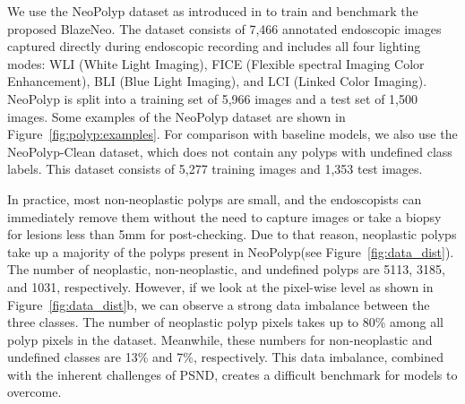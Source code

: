 \documentclass{ieeeaccess}
\newcommand{\ModelName}{BlazeNeo\xspace}
\newcommand{\DatasetName}{NeoPolyp\xspace}
\newcommand{\CleanDatasetName}{NeoPolyp-Clean\xspace}
\begin{document}
\begin{center}
    \begin{figure*}[ht!]
        \caption{Data distribution of polyp class labels in the \DatasetName dataset. In the pixel-wise distribution on the right, percentages are calculated on polyp pixels only (not including background pixels.)}
        \label{fig:data_dist}
    \end{figure*}
\end{center}

We use the \DatasetName dataset as introduced in \cite{lan2021neounet} to train and benchmark the proposed \ModelName{}. The dataset consists of 7,466 annotated endoscopic images captured directly during endoscopic recording and includes all four lighting modes: WLI (White Light Imaging), FICE (Flexible spectral Imaging Color Enhancement), BLI (Blue Light Imaging), and LCI (Linked Color Imaging). \DatasetName is split into a training set of 5,966 images and a test set of 1,500 images. Some examples of the \DatasetName dataset are shown in Figure~\ref{fig:polyp:examples}. For comparison with baseline models, we also use the \CleanDatasetName dataset, which does not contain any polyps with undefined class labels. This dataset consists of 5,277 training images and 1,353 test images.

In practice, most non-neoplastic polyps are small, and the endoscopists can immediately remove them without the need to capture images or take a biopsy for lesions less than 5mm for post-checking. Due to that reason, neoplastic polyps take up a majority of the polyps present in \DatasetName (see Figure~\ref{fig:data_dist}). The number of neoplastic, non-neoplastic, and undefined polyps are 5113, 3185, and 1031, respectively. However, if we look at the pixel-wise level as shown in Figure~\ref{fig:data_dist}b, we can observe a strong data imbalance between the three classes. The number of neoplastic polyp pixels takes up to 80\% among all polyp pixels in the dataset. Meanwhile, these numbers for non-neoplastic and undefined classes are 13\% and 7\%, respectively. This data imbalance, combined with the inherent challenges of PSND, creates a difficult benchmark for models to overcome.
\end{document}
